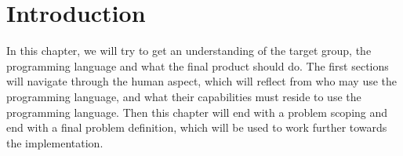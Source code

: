\section{Introduction}
In this chapter, we will try to get an understanding of the target group, the programming language and what the final product should do. The first sections will navigate through the human aspect, which will reflect from who may use the programming language, and what their capabilities must reside to use the programming language. Then this chapter will end with a problem scoping and end with a final problem definition, which will be used to work further towards the implementation.